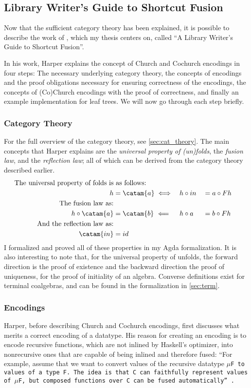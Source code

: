 \subsection{Library Writer's Guide to Shortcut Fusion}\label{sec:libfusion}
Now that the sufficient category theory has been explained, it is possible to describe the work of \cite{Harper2011}, which my thesis centers on, called ``A Library Writer's Guide to Shortcut Fusion''.

In his work, Harper explains the concept of Church and Cochurch encodings in four steps:
The necessary underlying category theory, the concepts of encodings and the proof obligations necessary for ensuring correctness of the encodings, the concepts of (Co)Church encodings with the proof of correctness, and finally an example implementation for leaf trees.
We will now go through each step briefly.
\subsubsection{Category Theory}
For the full overview of the category theory, see \autoref{sec:cat_theory}.
The main concepts that Harper explains are the \textit{universal property of (un)folds}, the \textit{fusion law}, and the \textit{reflection law}; all of which can be derived from the category theory described earlier.
\begin{alignat*}{3}
\text{The universal property of folds is}&\text{ as follows:} \\
h &= \catam{a} \iff && h \circ in &&= a \circ F h \\
\text{The fusion law as:} \\
h \circ \catam{a} &= \catam{b}~\Longleftarrow && h \circ a &&= b \circ F h \\
\text{And the reflection law as:} \\
\catam{in} &= id
\end{alignat*}
I formalized and proved all of these properties in my Agda formalization.
It is also interesting to note that, for the universal property of unfolds, the forward direction is the proof of existence and the backward direction the proof of uniqueness, for the proof of initiality of an algebra.
Converse definitions exist for terminal coalgebras, and can be found in the formalization in \autoref{sec:term}.

\subsubsection{Encodings}\label{sec:obligations}
Harper, before describing Church and Cochurch encodings, first discusses what merits a correct encoding of a datatype.
His reason for creating an encoding is to encode recursive functions, which are not inlined by Haskell's optimizer, into nonrecursive ones that are capable of being inlined and therefore fused:
``For example, assume that we want to convert values of the recursive datatype \tt{$\mu$F} to values of a type \tt{F}.  The idea is that \tt{C} can faithfully represent values of \tt{$\mu$F}, but composed functions over \tt{C} can be fused automatically'' \citep{Harper2011}.

